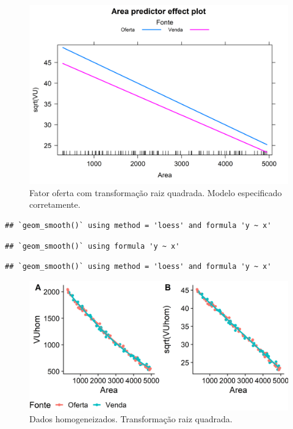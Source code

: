 \documentclass{article}
\begin{document}
\begin{figure}
\centering
\includegraphics{./images/rightModel3-1.png}
\caption{Fator oferta com transformação raiz quadrada. Modelo
especificado corretamente.}
\end{figure}

\begin{verbatim}
## `geom_smooth()` using method = 'loess' and formula 'y ~ x'
\end{verbatim}

\begin{verbatim}
## `geom_smooth()` using formula 'y ~ x'
\end{verbatim}

\begin{verbatim}
## `geom_smooth()` using method = 'loess' and formula 'y ~ x'
\end{verbatim}

\begin{figure}
\centering
\includegraphics{./images/dadosHomogeneizados3-1.png}
\caption{Dados homogeneizados. Transformação raiz quadrada.}
\end{figure}
\end{document}
